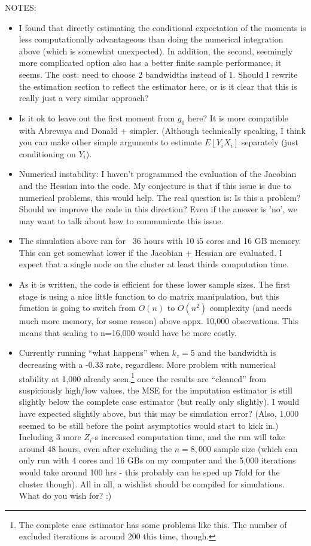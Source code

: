 \documentclass{article}
\theoremstyle{definition}
\theoremstyle{remark}
\begin{document}
NOTES:
\begin{itemize}
\item I found that directly estimating the conditional expectation of the moments is less computationally advantageous than doing the numerical integration above (which is somewhat unexpected). In addition, the second, seemingly more complicated option also has a better finite sample performance, it seems. The cost: need to choose 2 bandwidths instead of 1. Should I rewrite the estimation section to reflect the estimator here, or is it clear that this is really just a very similar approach? 
\item Is it ok to leave out the first moment from $g_0$ here? It is more compatible with Abrevaya and Donald + simpler. (Although technically speaking, I think you can make other simple arguments to estimate $E[Y_iX_i]$ separately (just conditioning on $Y_i$).
\item Numerical instability:  I haven't programmed the evaluation of the Jacobian and the Hessian into the code. My conjecture is that if this issue is due to numerical problems, this would help. The real question is: Is this a problem? Should we improve the code in this direction? Even if the answer is 'no', we may want to talk about how to communicate this issue.
\item The simulation above ran for ~36 hours with 10 i5 cores and 16 GB memory. This can get somewhat lower if the Jacobian + Hessian are evaluated. I expect that a single node on the cluster at least thirds computation time.
\item As it is written, the code is efficient for these lower sample sizes. The first stage is using a nice little function to do matrix manipulation, but this function is going to switch from $O(n)$ to $O(n^2)$ complexity (and needs much more memory, for some reason) above appx. 10,000 observations. This means that scaling to n=16,000 would have be more costly.
\item Currently running ``what happens'' when $k_z = 5$ and the bandwidth is decreasing with a -0.33 rate, regardless. More problem with numerical stability at 1,000 already seen,\footnote{The complete case estimator has some problems like this. The number of excluded iterations is around 200 this time, though.} once the results are ``cleaned'' from suspiciously high/low values, the MSE for the imputation estimator is still slightly below the complete case estimator (but really only slightly). I would have expected slightly above, but this may be simulation error? (Also, 1,000 seemed to be still before the point asymptotics would start to kick in.) Including 3 more $Z_i$-s increased computation time, and the run will take around 48 hours, even after excluding the $n=8,000$ sample size (which can only run with 4 cores and 16 GBs on my computer and the 5,000 iterations would take around 100 hrs - this probably can be sped up 7fold for the cluster though). All in all, a wishlist should be compiled for simulations. What do you wish for? :)
\end{itemize}
\end{document}
